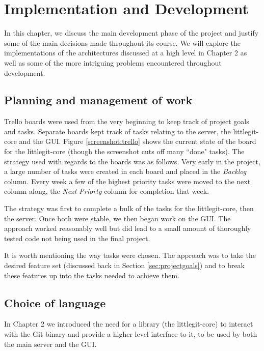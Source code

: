 \chapter{Implementation and Development}

In this chapter, we discuss the main development phase of the project and justify some of the main decisions made throughout its course. We will explore the implementations of the architectures discussed at a high level in Chapter 2 as well as some of the more intriguing problems encountered throughout development.


\section{Planning and management of work}

Trello boards were used from the very beginning to keep track of project goals and tasks. Separate boards kept track of tasks relating to the server, the littlegit-core and the GUI. Figure \ref{screenshot:trello} shows the current state of the board for the littlegit-core (though the screenshot cuts off many ``done" tasks). The strategy used with regards to the boards was as follows. Very early in the project, a large number of tasks were created in each board and placed in the \emph{Backlog} column. Every week a few of the highest priority tasks were moved to the next column along, the \emph{Next Priorty} column for completion that week. 


The strategy was first to complete a bulk of the tasks for the littlegit-core, then the server. Once both were stable, we then began work on the GUI. The approach worked reasonably well but did lead to a small amount of thoroughly tested code not being used in the final project.

It is worth mentioning the way tasks were chosen. The approach was to take the desired feature set (discussed back in Section \ref{sec:projectgoals}) and to break these features up into the tasks needed to achieve them.



\section{Choice of language}

In Chapter 2 we introduced the need for a library (the littlegit-core) to interact with the Git binary and provide a higher level interface to it, to be used by both the main server and the GUI. 

